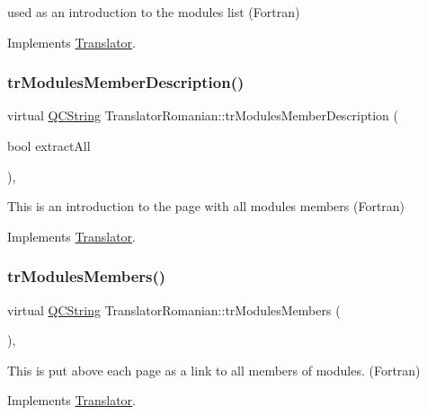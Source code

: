 used as an introduction to the modules list (Fortran) 

Implements \mbox{\hyperlink{class_translator}{Translator}}.

\mbox{\label{class_translator_romanian_aafc4c1cb4e87730d4dd2b29b15b99b82}} 
\subsubsection{\texorpdfstring{trModulesMemberDescription()}{trModulesMemberDescription()}}
{\footnotesize\ttfamily virtual \mbox{\hyperlink{class_q_c_string}{Q\+C\+String}} Translator\+Romanian\+::tr\+Modules\+Member\+Description (\begin{DoxyParamCaption}\item[{bool}]{extract\+All }\end{DoxyParamCaption})\hspace{0.3cm}{\ttfamily [inline]}, {\ttfamily [virtual]}}

This is an introduction to the page with all modules members (Fortran) 

Implements \mbox{\hyperlink{class_translator}{Translator}}.

\mbox{\label{class_translator_romanian_a8f3d36f33d2ca8b0a41e2eae8f2bd11b}} 
\subsubsection{\texorpdfstring{trModulesMembers()}{trModulesMembers()}}
{\footnotesize\ttfamily virtual \mbox{\hyperlink{class_q_c_string}{Q\+C\+String}} Translator\+Romanian\+::tr\+Modules\+Members (\begin{DoxyParamCaption}{ }\end{DoxyParamCaption})\hspace{0.3cm}{\ttfamily [inline]}, {\ttfamily [virtual]}}

This is put above each page as a link to all members of modules. (Fortran) 

Implements \mbox{\hyperlink{class_translator}{Translator}}.


